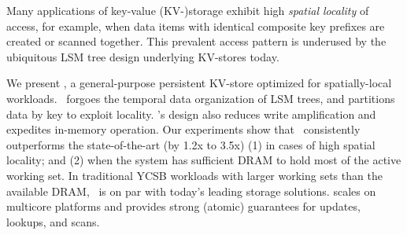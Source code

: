 Many applications of key-value (KV-)storage exhibit high \emph{spatial locality}
of access, for example, when data items with identical composite key prefixes are created or scanned together.  
This prevalent access pattern is underused by the ubiquitous LSM tree design underlying KV-stores today.

We present \sys, a general-purpose persistent KV-store optimized for spatially-local workloads. 
\sys\ forgoes the temporal data organization of LSM trees, and partitions data by key to exploit locality. 
%
\sys's design also reduces write amplification and expedites in-memory operation.
Our experiments show that \sys\ consistently outperforms the state-of-the-art (by 1.2x to 3.5x)
(1)  in cases of high spatial locality; and (2) when the system has sufficient DRAM to hold most of the active working set. 
In traditional YCSB workloads with larger working sets than the available  DRAM, \sys\ is on par with 
today's leading storage solutions.
\sys\/ scales on multicore platforms and provides strong (atomic) guarantees for updates, lookups, and scans. 
